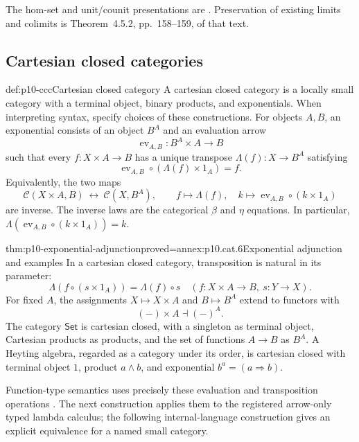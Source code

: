 The hom-set and unit/counit presentations are
\cite[Definition~4.1.1, p.~132; Definition~4.2.5 and
Theorem~4.2.7, pp.~140--142]{Riehl2026ContextOnline}.
Preservation of existing limits and colimits is Theorem~4.5.2,
pp.~158--159, of that text.

\subsection{Cartesian closed categories}

\begin{hbdefinition}{def:p10-ccc}{Cartesian closed category}
A cartesian closed category is a locally small category with a
terminal object, binary products, and exponentials.
When interpreting syntax, specify choices of these constructions.
For objects \(A,B\), an exponential consists of an object \(B^A\)
and an evaluation arrow
\[
                    \operatorname{ev}_{A,B}:B^A\times A\to B
\]
such that every \(f:X\times A\to B\) has a unique transpose
\(\Lambda(f):X\to B^A\) satisfying
\[
 \operatorname{ev}_{A,B}\circ(\Lambda(f)\times1_A)=f.
\]
Equivalently, the two maps
\[
 \mathcal C(X\times A,B)\ \longleftrightarrow\
 \mathcal C(X,B^A),\qquad
 f\longmapsto\Lambda(f),\quad
 k\longmapsto\operatorname{ev}_{A,B}\circ(k\times1_A)
\]
are inverse.  The inverse laws are the categorical \(\beta\)
and \(\eta\) equations.
In particular,
\(\Lambda(\operatorname{ev}_{A,B}\circ(k\times1_A))=k\).
\index{evaluation!of an exponential}
\end{hbdefinition}

\begin{hbtheorem}{thm:p10-exponential-adjunction}{proved=annex:p10.cat.6}{Exponential adjunction and examples}
In a cartesian closed category, transposition is natural in its
parameter:
\[
 \Lambda(f\circ(s\times1_A))=\Lambda(f)\circ s
       \quad(f:X\times A\to B,\ s:Y\to X).
\]
For fixed \(A\), the assignments \(X\mapsto X\times A\) and
\(B\mapsto B^A\) extend to functors with
\[
                         (-)\times A\dashv(-)^A.
\]
The category \(\mathsf{Set}\) is cartesian closed, with a singleton
as terminal object, Cartesian products as products, and the set
of functions \(A\to B\) as \(B^A\).
A Heyting algebra, regarded as a category under its order, is
cartesian closed with terminal object \(1\), product \(a\wedge b\),
and exponential \(b^a=(a\Rightarrow b)\).
\end{hbtheorem}

Function-type semantics uses precisely these evaluation and
transposition operations
\cite[Section~3.3, pp.~22--24]{Pitts1995Draft}.
The next construction applies them to the registered arrow-only
typed lambda calculus; the following internal-language construction
gives an explicit equivalence for a named small category.
